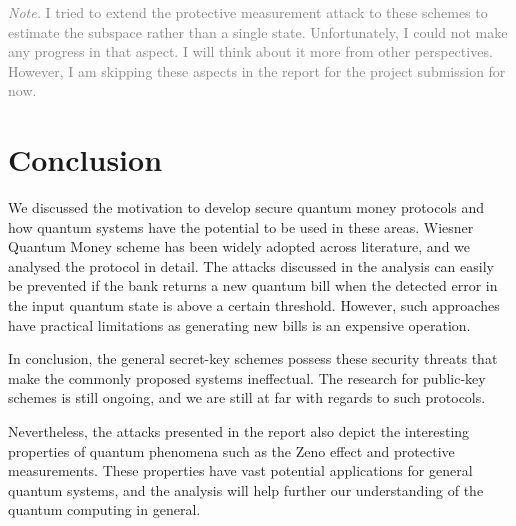 \documentclass[]{article}
\begin{document}
\textcolor{gray}{\textit{Note.} I tried to extend the protective measurement attack to these schemes to estimate the subspace rather than a single state. Unfortunately, I could not make any progress in that aspect. I will think about it more from other perspectives. However, I am skipping these aspects in the report for the project submission for now.} 
\section{Conclusion}
We discussed the motivation to develop secure quantum money protocols and how quantum systems have the potential to be used in these areas. Wiesner Quantum Money scheme has been widely adopted across literature, and we analysed the protocol in detail. The attacks discussed in the analysis can easily be prevented if the bank returns a new quantum bill when the detected error in the input quantum state is above a certain threshold. However, such approaches have practical limitations as generating new bills is an expensive operation.

In conclusion, the general secret-key schemes possess these security threats that make the commonly proposed systems ineffectual. The research for public-key schemes is still ongoing, and we are still at far with regards to such protocols.

Nevertheless, the attacks presented in the report also depict the interesting properties of quantum phenomena such as the Zeno effect and protective measurements. These properties have vast potential applications for general quantum systems, and the analysis will help further our understanding of the quantum computing in general.
\clearpage


\end{document}
